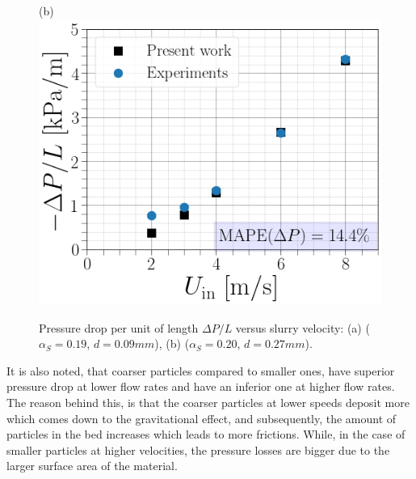 \documentclass[11pt]{report}
\begin{document}
\begin{minipage}[t]{0.35\textwidth}
\begin{minipage}[t]{0.5\textwidth}
\begin{minipage}[t]{0.35\textwidth}
\begin{minipage}[t]{0.35\textwidth}
\begin{figure}[ht!]
 \end{figure}
%
 \begin{figure}[ht!]
 \begin{center}
 (b)\includegraphics[scale = 0.3]{figs/DP27}
 \end{center}
 \end{figure}
\begin{figure}[ht!]
 \centering
 \caption{Pressure drop per unit of length $\Delta P/L$  versus slurry velocity: (a) ($\alpha_S=0.19$, $d=0.09 mm$), (b) ($\alpha_S=0.20$, $d=0.27 mm$).}
 \label{P}
 \end{figure}
 It is also noted, that coarser particles compared to smaller ones, have superior pressure drop at lower flow rates and have an inferior one at higher flow rates.  
 The reason behind this, is that the coarser particles at lower speeds deposit more which comes down to the gravitational effect, and subsequently, the amount of particles in the bed increases which leads to more frictions. 
 While, in the case of smaller particles at higher velocities, the  pressure losses are bigger due to the larger surface area of the material.

\end{minipage}
\end{minipage}
\end{minipage}
\end{minipage}
\end{document}
